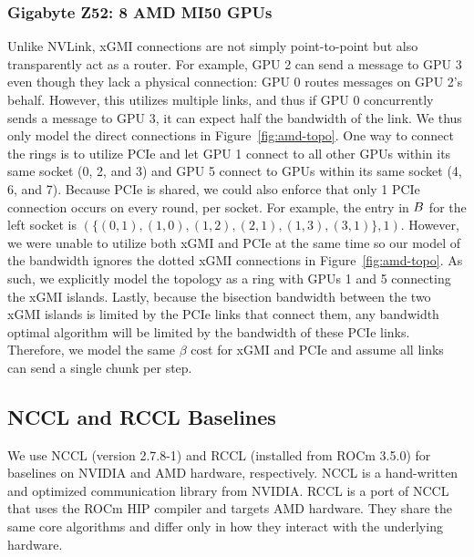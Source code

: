 \subsubsection{Gigabyte Z52: 8 AMD MI50 GPUs}
Unlike NVLink, xGMI connections are not simply point-to-point but also
transparently act as a router.  For example, GPU 2 can send a message
to GPU 3 even though they lack a physical connection: GPU 0 routes
messages on GPU 2's behalf.  However, this utilizes multiple links,
and thus if GPU 0 concurrently sends a message to GPU 3, it can expect
half the bandwidth of the link.  We thus only model the direct
connections in Figure~\ref{fig:amd-topo}.  One way to connect the
rings is to utilize PCIe and let GPU 1 connect to all other GPUs
within its same socket (0, 2, and 3) and GPU 5 connect to GPUs within
its same socket (4, 6, and 7).  Because PCIe is shared, we could also
enforce that only 1 PCIe connection occurs on every round, per socket.
%
For example, the entry in $B$ for the left socket is
$(\{(0,1),(1,0),(1,2),(2,1),(1,3),(3,1)\},1)$.
%
However, we were unable to utilize both xGMI and PCIe at the same time
so our model of the bandwidth ignores the dotted xGMI connections in
Figure~\ref{fig:amd-topo}.  As such, we explicitly model the topology
as a ring with GPUs 1 and 5 connecting the xGMI islands. Lastly,
because the bisection bandwidth between the two xGMI islands is
limited by the PCIe links that connect them, any bandwidth optimal
algorithm will be limited by the bandwidth of these PCIe links.
Therefore, we model the same $\beta$ cost for xGMI and PCIe and assume
all links can send a single chunk per step.


\subsection{NCCL and RCCL Baselines}
We use NCCL (version 2.7.8-1) and RCCL (installed from ROCm 3.5.0) for
baselines on NVIDIA and AMD hardware, respectively.  NCCL is a
hand-written and optimized communication library from NVIDIA. RCCL is
a port of NCCL that uses the ROCm HIP compiler and targets AMD
hardware. They share the same core algorithms and differ only in how
they interact with the underlying hardware.


